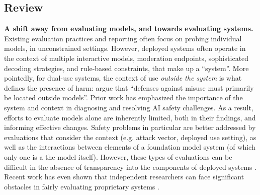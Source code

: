 

\subsection{Review}
\label{sec:eval-review}

\textbf{A shift away from evaluating models, and towards evaluating systems.}
Existing evaluation practices and reporting often focus on probing individual models, in unconstrained settings.
However, deployed systems often operate in the context of multiple interactive models, moderation endpoints, sophisticated decoding strategies, and rule-based constraints, that make up a ``system''.
More pointedly, for dual-use systems, the context of use \emph{outside the system} is what defines the presence of harm: \citet{NarayananKapoor2024} argue that ``defenses against misuse must primarily be located outside models''.
Prior work has emphasized the importance of the system \citep{dobbe2022system} and context \citep{raji2023concrete} in diagnosing and resolving AI safety challenges.
As a result, efforts to evaluate models alone are inherently limited, both in their findings, and informing effective changes.
Safety problems in particular are better addressed by evaluations that consider the context (e.g. attack vector, deployed use setting), as well as the interactions between elements of a foundation model system (of which only one is a the model itself).
However, these types of evaluations can be difficult in the absence of transparency into the components of deployed systems \citep{bommasani2023foundation}.
Recent work has even shown that independent researchers can face significant obstacles in fairly evaluating proprietary systems \citep{longpre2024safe}.

